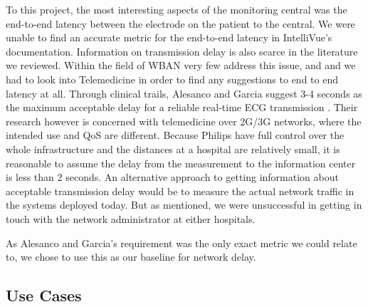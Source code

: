 To this project, the most interesting aspects of the monitoring central was the end-to-end latency between the electrode on the patient to the central. We were unable to find an accurate metric for the end-to-end latency in IntelliVue's documentation. Information on transmission delay is also scarce in the literature we reviewed. Within the field of WBAN very few address this issue, and and we had to look into Telemedicine in order to find any suggestions to end to end latency at all. Through clinical trails, Alesanco and Garcia suggest 3-4 seconds as the maximum acceptable delay for a reliable real-time ECG transmission \cite{Alesanco:2010kc}. Their research however is concerned with telemedicine over 2G/3G networks, where the intended use and QoS are different. 
Because Philips have full control over the whole infrastructure and the distances at a hospital are relatively small, it is reasonable to assume the delay from the measurement to the information center is less than 2 seconds. An alternative approach to getting information about acceptable transmission delay would be to measure the actual network traffic in the systems deployed today. But as mentioned, we were unsuccessful in getting in touch with the network administrator at either hospitals.

As Alesanco and Garcia's requirement was the only exact metric we could relate to, we chose to use this as our baseline for network delay.


\subsection{Use Cases} %
\label{ssub:use_cases}

